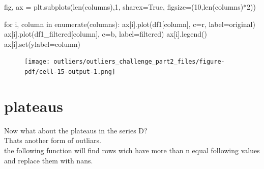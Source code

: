 \documentclass[
  letterpaper,
  DIV=11,
  numbers=noendperiod,
  oneside]{scrreprt}
\newenvironment{Shaded}{\begin{snugshade}}{\end{snugshade}}
\newcommand{\BuiltInTok}[1]{\textcolor[rgb]{0.00,0.23,0.31}{#1}}
\newcommand{\ControlFlowTok}[1]{\textcolor[rgb]{0.00,0.23,0.31}{#1}}
\newcommand{\DecValTok}[1]{\textcolor[rgb]{0.68,0.00,0.00}{#1}}
\newcommand{\KeywordTok}[1]{\textcolor[rgb]{0.00,0.23,0.31}{#1}}
\newcommand{\NormalTok}[1]{\textcolor[rgb]{0.00,0.23,0.31}{#1}}
\newcommand{\OperatorTok}[1]{\textcolor[rgb]{0.37,0.37,0.37}{#1}}
\newcommand{\StringTok}[1]{\textcolor[rgb]{0.13,0.47,0.30}{#1}}
\newcommand{\VariableTok}[1]{\textcolor[rgb]{0.07,0.07,0.07}{#1}}
\begin{document}
\begin{Shaded}
\begin{Highlighting}[]
\NormalTok{fig, ax }\OperatorTok{=}\NormalTok{ plt.subplots(}\BuiltInTok{len}\NormalTok{(columns),}\DecValTok{1}\NormalTok{, sharex}\OperatorTok{=}\VariableTok{True}\NormalTok{, figsize}\OperatorTok{=}\NormalTok{(}\DecValTok{10}\NormalTok{,}\BuiltInTok{len}\NormalTok{(columns)}\OperatorTok{*}\DecValTok{2}\NormalTok{))}

\ControlFlowTok{for}\NormalTok{ i, column }\KeywordTok{in} \BuiltInTok{enumerate}\NormalTok{(columns):}
\NormalTok{    ax[i].plot(df1[column], c}\OperatorTok{=}\StringTok{\textquotesingle{}r\textquotesingle{}}\NormalTok{, label}\OperatorTok{=}\StringTok{\textquotesingle{}original\textquotesingle{}}\NormalTok{)}
\NormalTok{    ax[i].plot(df1\_filtered[column], c}\OperatorTok{=}\StringTok{\textquotesingle{}b\textquotesingle{}}\NormalTok{, label}\OperatorTok{=}\StringTok{\textquotesingle{}filtered\textquotesingle{}}\NormalTok{)}
\NormalTok{    ax[i].legend()}
\NormalTok{    ax[i].}\BuiltInTok{set}\NormalTok{(ylabel}\OperatorTok{=}\NormalTok{column)}
\end{Highlighting}
\end{Shaded}

\begin{figure}[H]

{\centering \texttt{[image: outliers/outliers\_challenge\_part2\_files/figure-pdf/cell-15-output-1.png]}

}

\end{figure}

\hypertarget{plateaus}{%
\section{plateaus}\label{plateaus}}

Now what about the plateaus in the series D?\\
Thats another form of outliars.\\
the following function will find rows wich have more than n equal
following values and replace them with nans.
\end{document}
